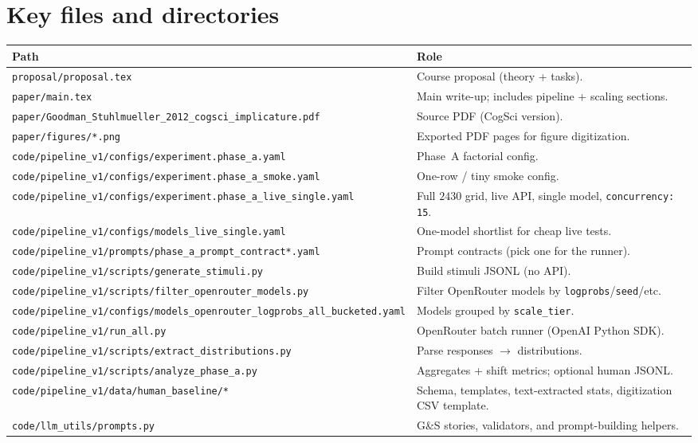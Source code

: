 \documentclass[11pt]{article}
\begin{document}
\section{Key files and directories}
\begin{table}[h]
\centering
\small
\begin{tabular}{@{}p{}p{}@{}}
\toprule
\textbf{Path} & \textbf{Role} \\
\midrule
\texttt{proposal/proposal.tex} & Course proposal (theory + tasks). \\
\texttt{paper/main.tex} & Main write-up; includes pipeline + scaling sections. \\
\texttt{paper/Goodman\_Stuhlmueller\_2012\_cogsci\_implicature.pdf} & Source PDF (CogSci version). \\
\texttt{paper/figures/*.png} & Exported PDF pages for figure digitization. \\
\texttt{code/pipeline\_v1/configs/experiment.phase\_a.yaml} & Phase~A factorial config. \\
\texttt{code/pipeline\_v1/configs/experiment.phase\_a\_smoke.yaml} & One-row / tiny smoke config. \\
\texttt{code/pipeline\_v1/configs/experiment.phase\_a\_live\_single.yaml} & Full $2430$ grid, live API, single model, \texttt{concurrency: 15}. \\
\texttt{code/pipeline\_v1/configs/models\_live\_single.yaml} & One-model shortlist for cheap live tests. \\
\texttt{code/pipeline\_v1/prompts/phase\_a\_prompt\_contract*.yaml} & Prompt contracts (pick one for the runner). \\
\texttt{code/pipeline\_v1/scripts/generate\_stimuli.py} & Build stimuli JSONL (no API). \\
\texttt{code/pipeline\_v1/scripts/filter\_openrouter\_models.py} & Filter OpenRouter models by \texttt{logprobs}/\texttt{seed}/etc. \\
\texttt{code/pipeline\_v1/configs/models\_openrouter\_logprobs\_all\_bucketed.yaml} & Models grouped by \texttt{scale\_tier}. \\
\texttt{code/pipeline\_v1/run\_all.py} & OpenRouter batch runner (OpenAI Python SDK). \\
\texttt{code/pipeline\_v1/scripts/extract\_distributions.py} & Parse responses $\rightarrow$ distributions. \\
\texttt{code/pipeline\_v1/scripts/analyze\_phase\_a.py} & Aggregates + shift metrics; optional human JSONL. \\
\texttt{code/pipeline\_v1/data/human\_baseline/*} & Schema, templates, text-extracted stats, digitization CSV template. \\
\texttt{code/llm\_utils/prompts.py} & G\&S stories, validators, and prompt-building helpers. \\
\bottomrule
\end{tabular}
\end{table}
\end{document}
